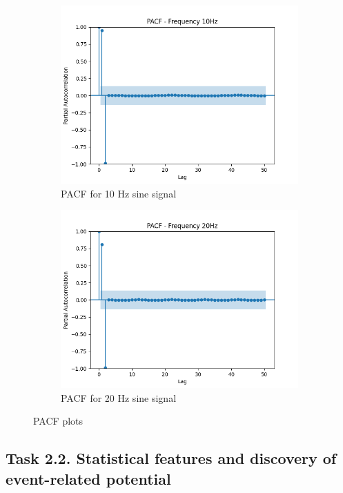 \documentclass{article}
\begin{document}
\begin{figure}[htbp]
  \centering
  \begin{subfigure}[b]{0.45\textwidth}
    \includegraphics[width=\textwidth]{img/stacked_sin/PACF10HZ.png}
    \caption{PACF for 10 Hz sine signal}
    \label{fig:Pacf10}
  \end{subfigure}
  \hfill
  \begin{subfigure}[b]{0.45\textwidth}
    \includegraphics[width=\textwidth]{img/stacked_sin/PACF20HZ.png}
    \caption{PACF for 20 Hz sine signal}
    \label{fig:pacf20}
  \end{subfigure}
  \caption{PACF plots}
  \label{fig:ACFsines}
\end{figure}
\subsection{Task 2.2. Statistical features and discovery of event-related potential}
\end{document}
